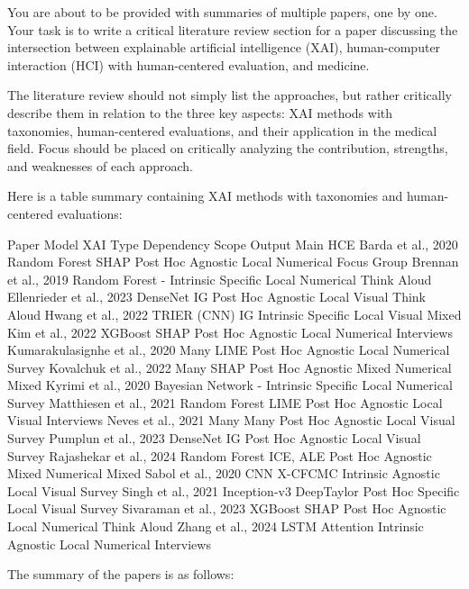 You are about to be provided with summaries of multiple papers, one by one. Your task is to write a critical literature review section for a paper discussing the intersection between explainable artificial intelligence (XAI), human-computer interaction (HCI) with human-centered evaluation, and medicine.

The literature review should not simply list the approaches, but rather critically describe them in relation to the three key aspects: XAI methods with taxonomies, human-centered evaluations, and their application in the medical field. Focus should be placed on critically analyzing the contribution, strengths, and weaknesses of each approach.

Here is a table summary containing XAI methods with taxonomies and human-centered evaluations:

Paper	Model	XAI	Type	Dependency	Scope	Output	Main HCE
Barda et al., 2020	Random Forest	SHAP	Post Hoc	Agnostic	Local	Numerical	Focus Group
Brennan et al., 2019	Random Forest	-	Intrinsic	Specific	Local	Numerical	Think Aloud
Ellenrieder et al., 2023	DenseNet	IG	Post Hoc	Agnostic	Local	Visual	Think Aloud
Hwang et al., 2022	TRIER (CNN)	IG	Intrinsic	Specific	Local	Visual	Mixed
Kim et al., 2022	XGBoost	SHAP	Post Hoc	Agnostic	Local	Numerical	Interviews
Kumarakulasignhe et al., 2020	Many	LIME	Post Hoc	Agnostic	Local	Numerical	Survey
Kovalchuk et al., 2022	Many	SHAP	Post Hoc	Agnostic	Mixed	Numerical	Mixed
Kyrimi et al., 2020	Bayesian Network	-	Intrinsic	Specific	Local	Numerical	Survey
Matthiesen et al., 2021	Random Forest	LIME	Post Hoc	Agnostic	Local	Visual	Interviews
Neves et al., 2021	Many	Many	Post Hoc	Agnostic	Local	Visual	Survey
Pumplun et al., 2023	DenseNet	IG	Post Hoc	Agnostic	Local	Visual	Survey
Rajashekar et al., 2024	Random Forest	ICE, ALE	Post Hoc	Agnostic	Mixed	Numerical	Mixed
Sabol et al., 2020	CNN	X-CFCMC	Intrinsic	Agnostic	Local	Visual	Survey
Singh et al., 2021	Inception-v3	DeepTaylor	Post Hoc	Specific	Local	Visual	Survey
Sivaraman et al., 2023	XGBoost	SHAP	Post Hoc	Agnostic	Local	Numerical	Think Aloud
Zhang et al., 2024	LSTM	Attention	Intrinsic	Agnostic	Local	Numerical	Interviews



The summary of the papers is as follows:


